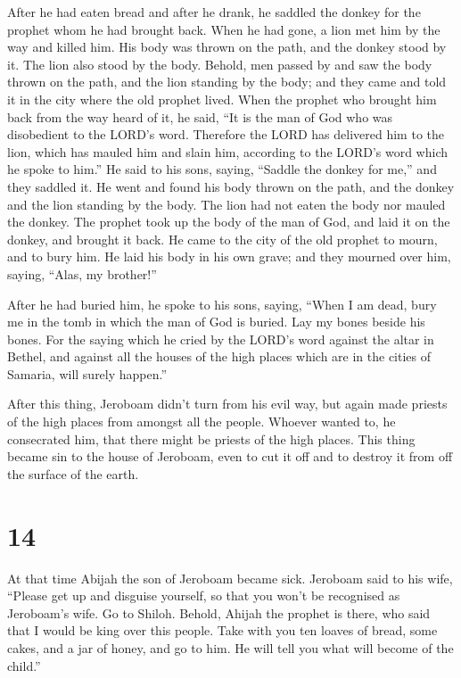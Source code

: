  After he had eaten bread and after he drank, he saddled
the donkey for the prophet whom he had brought back.  When
he had gone, a lion met him by the way and killed him. His body was
thrown on the path, and the donkey stood by it. The lion also stood by
the body.  Behold, men passed by and saw the body thrown on
the path, and the lion standing by the body; and they came and told it
in the city where the old prophet lived.  When the prophet
who brought him back from the way heard of it, he said, ``It is the man
of God who was disobedient to the LORD's word. Therefore the LORD has
delivered him to the lion, which has mauled him and slain him, according
to the LORD's word which he spoke to him.''  He said to his
sons, saying, ``Saddle the donkey for me,'' and they saddled it.
 He went and found his body thrown on the path, and the
donkey and the lion standing by the body. The lion had not eaten the
body nor mauled the donkey.  The prophet took up the body
of the man of God, and laid it on the donkey, and brought it back. He
came to the city of the old prophet to mourn, and to bury him.
 He laid his body in his own grave; and they mourned over
him, saying, ``Alas, my brother!''

 After he had buried him, he spoke to his sons, saying,
``When I am dead, bury me in the tomb in which the man of God is buried.
Lay my bones beside his bones.  For the saying which he
cried by the LORD's word against the altar in Bethel, and against all
the houses of the high places which are in the cities of Samaria, will
surely happen.''

 After this thing, Jeroboam didn't turn from his evil way,
but again made priests of the high places from amongst all the people.
Whoever wanted to, he consecrated him, that there might be priests of
the high places.  This thing became sin to the house of
Jeroboam, even to cut it off and to destroy it from off the surface of
the earth.

\hypertarget{section-13}{%
\section{14}\label{section-13}}

 At that time Abijah the son of Jeroboam became sick.
 Jeroboam said to his wife, ``Please get up and disguise
yourself, so that you won't be recognised as Jeroboam's wife. Go to
Shiloh. Behold, Ahijah the prophet is there, who said that I would be
king over this people.  Take with you ten loaves of bread,
some cakes, and a jar of honey, and go to him. He will tell you what
will become of the child.''

